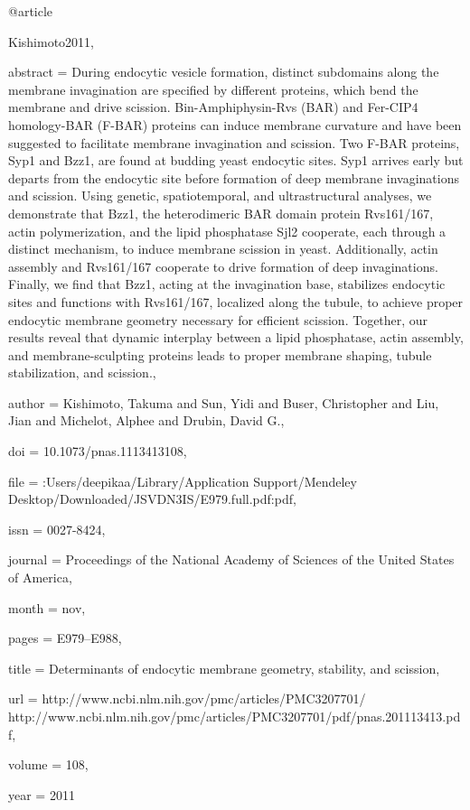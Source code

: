 @article{Kishimoto2011,

abstract = {During endocytic vesicle formation, distinct subdomains along the membrane invagination are specified by different proteins, which bend the membrane and drive scission. Bin-Amphiphysin-Rvs (BAR) and Fer-CIP4 homology-BAR (F-BAR) proteins can induce membrane curvature and have been suggested to facilitate membrane invagination and scission. Two F-BAR proteins, Syp1 and Bzz1, are found at budding yeast endocytic sites. Syp1 arrives early but departs from the endocytic site before formation of deep membrane invaginations and scission. Using genetic, spatiotemporal, and ultrastructural analyses, we demonstrate that Bzz1, the heterodimeric BAR domain protein Rvs161/167, actin polymerization, and the lipid phosphatase Sjl2 cooperate, each through a distinct mechanism, to induce membrane scission in yeast. Additionally, actin assembly and Rvs161/167 cooperate to drive formation of deep invaginations. Finally, we find that Bzz1, acting at the invagination base, stabilizes endocytic sites and functions with Rvs161/167, localized along the tubule, to achieve proper endocytic membrane geometry necessary for efficient scission. Together, our results reveal that dynamic interplay between a lipid phosphatase, actin assembly, and membrane-sculpting proteins leads to proper membrane shaping, tubule stabilization, and scission.},

author = {Kishimoto, Takuma and Sun, Yidi and Buser, Christopher and Liu, Jian and Michelot, Alphee and Drubin, David G.},

doi = {10.1073/pnas.1113413108},

file = {:Users/deepikaa/Library/Application Support/Mendeley Desktop/Downloaded/JSVDN3IS/E979.full.pdf:pdf},

issn = {0027-8424},

journal = {Proceedings of the National Academy of Sciences of the United States of America},

month = {nov},

pages = {E979--E988},

title = {{Determinants of endocytic membrane geometry, stability, and scission}},

url = {http://www.ncbi.nlm.nih.gov/pmc/articles/PMC3207701/ http://www.ncbi.nlm.nih.gov/pmc/articles/PMC3207701/pdf/pnas.201113413.pdf},

volume = {108},

year = {2011}

}

